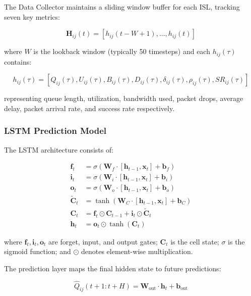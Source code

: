 The Data Collector maintains a sliding window buffer for each ISL, tracking seven key metrics:

\begin{equation}
\mathbf{H}_{ij}(t) = [h_{ij}(t-W+1), ..., h_{ij}(t)]
\end{equation}

where $W$ is the lookback window (typically 50 timesteps) and each $h_{ij}(\tau)$ contains:

\begin{equation}
h_{ij}(\tau) = [Q_{ij}(\tau), U_{ij}(\tau), B_{ij}(\tau), D_{ij}(\tau), \delta_{ij}(\tau), \rho_{ij}(\tau), SR_{ij}(\tau)]
\end{equation}

representing queue length, utilization, bandwidth used, packet drops, average delay, packet arrival rate, and success rate respectively.

\subsubsection{LSTM Prediction Model}

The LSTM architecture consists of:

\begin{equation}
\begin{split}
\mathbf{f}_t &= \sigma(\mathbf{W}_f \cdot [\mathbf{h}_{t-1}, \mathbf{x}_t] + \mathbf{b}_f) \\
\mathbf{i}_t &= \sigma(\mathbf{W}_i \cdot [\mathbf{h}_{t-1}, \mathbf{x}_t] + \mathbf{b}_i) \\
\mathbf{o}_t &= \sigma(\mathbf{W}_o \cdot [\mathbf{h}_{t-1}, \mathbf{x}_t] + \mathbf{b}_o) \\
\tilde{\mathbf{C}}_t &= \tanh(\mathbf{W}_C \cdot [\mathbf{h}_{t-1}, \mathbf{x}_t] + \mathbf{b}_C) \\
\mathbf{C}_t &= \mathbf{f}_t \odot \mathbf{C}_{t-1} + \mathbf{i}_t \odot \tilde{\mathbf{C}}_t \\
\mathbf{h}_t &= \mathbf{o}_t \odot \tanh(\mathbf{C}_t)
\end{split}
\end{equation}

where $\mathbf{f}_t, \mathbf{i}_t, \mathbf{o}_t$ are forget, input, and output gates; $\mathbf{C}_t$ is the cell state; $\sigma$ is the sigmoid function; and $\odot$ denotes element-wise multiplication.

The prediction layer maps the final hidden state to future predictions:

\begin{equation}
\hat{Q}_{ij}(t+1:t+H) = \mathbf{W}_{\text{out}} \cdot \mathbf{h}_t + \mathbf{b}_{\text{out}}
\end{equation}

